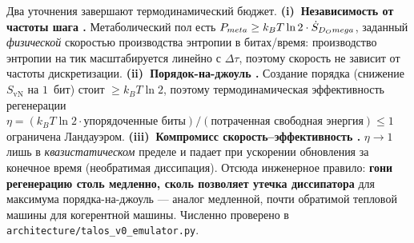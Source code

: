 \begin{claimbox}
Два уточнения завершают термодинамический бюджет. \textbf{(i)~Независимость от
частоты шага .} Метаболический пол есть
$P_{meta} \ge k_B T\ln 2\cdot\dot S_{D_Omega}$, заданный
\emph{физической} скоростью производства энтропии в битах/время: производство
энтропии на тик масштабируется линейно с $\Delta\tau$, поэтому скорость не
зависит от частоты дискретизации. \textbf{(ii)~Порядок-на-джоуль .}
Создание порядка (снижение $S_{\mathrm{vN}}$ на $1$~бит) стоит
$\geq k_B T\ln 2$, поэтому термодинамическая эффективность регенерации
$\eta = (k_B T\ln 2\cdot\text{упорядоченные биты})/(\text{потраченная свободная энергия}) \leq 1$
ограничена Ландауэром. \textbf{(iii)~Компромисс скорость--эффективность .}
$\eta\to 1$ лишь в \emph{квазистатическом} пределе и падает при ускорении
обновления за конечное время (необратимая диссипация). Отсюда инженерное
правило: \textbf{гони регенерацию столь медленно, сколь позволяет утечка
диссипатора} для максимума порядка-на-джоуль --- аналог медленной, почти
обратимой тепловой машины для когерентной машины. Численно проверено в
\texttt{architecture/talos\_v0\_emulator.py}.
\end{claimbox}
